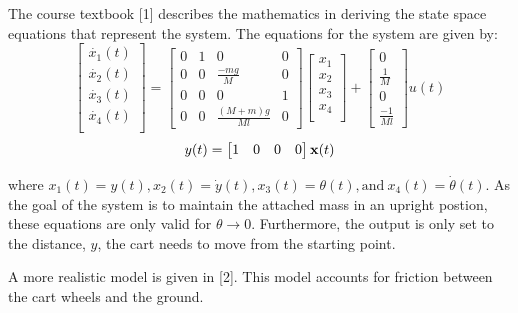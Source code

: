 \documentclass[11pt]{article}
\begin{document}
The course textbook {[}1{]} describes the mathematics in deriving the
state space equations that represent the system. The equations for the
system are given by: 
\[
\begin{bmatrix}
    \dot{x_1}(t)\\
    \dot{x_2}(t)\\
    \dot{x_3}(t)\\
    \dot{x_4}(t)\\
\end{bmatrix}=\begin{bmatrix}
    0 & 1 & 0 & 0 \\
    0 & 0 & \frac{-mg}{M} & 0 \\
    0 & 0 & 0 & 1 \\
    0 & 0 & \frac{(M+m)g}{Ml} & 0
    \end{bmatrix}\begin{bmatrix}
    x_1 \\
    x_2 \\
    x_3 \\
    x_4 \\
    \end{bmatrix} + \begin{bmatrix}
    0 \\ \frac{1}{M} \\ 0 \\ \frac{-1}{Ml}
    \end{bmatrix} u(t) 
 \]\[   \\
    y(t) = \begin{bmatrix}
    1 & 0 & 0 & 0
    \end{bmatrix}\mathbf{x}(t)
\]

where $ x_1(t) = y(t), x_2(t)=\dot{y}(t),x_3(t) =\theta(t),
\mathrm{and\ } x_4(t)=\dot{\theta}(t)$. As the goal of the system is
to maintain the attached mass in an upright postion, these equations are
only valid for \(\theta \rightarrow 0\). Furthermore, the output is only
set to the distance, \(y\), the cart needs to move from the starting
point.

A more realistic model is given in {[}2{]}. This model accounts for
friction between the cart wheels and the ground.
\end{document}
